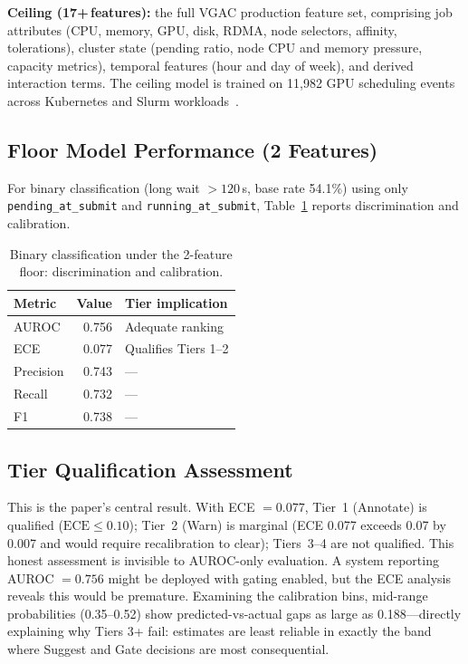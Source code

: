 \documentclass[sigconf]{acmart}
\begin{document}
\textbf{Ceiling (17+\,features):} the full VGAC production feature set, comprising job attributes (CPU, memory, GPU, disk, RDMA, node selectors, affinity, tolerations), cluster state (pending ratio, node CPU and memory pressure, capacity metrics), temporal features (hour and day of week), and derived interaction terms. The ceiling model is trained on 11,982 GPU scheduling events across Kubernetes and Slurm workloads~\cite{espira2026benchmark}.

\subsection{Floor Model Performance (2 Features)}
For binary classification (long wait $> 120$\,s, base rate 54.1\%) using only \texttt{pending\_at\_submit} and \texttt{running\_at\_submit}, Table~\ref{tab:floor} reports discrimination and calibration.

\begin{table}[t]
\centering
\caption{Binary classification under the 2-feature floor: discrimination and calibration.}
\label{tab:floor}
\small
\begin{tabular}{@{}lrl@{}}
\toprule
\textbf{Metric}    & \textbf{Value} & \textbf{Tier implication} \\
\midrule
AUROC              & 0.756 & Adequate ranking \\
ECE                & 0.077 & Qualifies Tiers 1--2 \\
Precision          & 0.743 & --- \\
Recall             & 0.732 & --- \\
F1                 & 0.738 & --- \\
\bottomrule
\end{tabular}
\end{table}

\subsection{Tier Qualification Assessment}
This is the paper's central result. With ECE $=0.077$, Tier~1 (Annotate) is qualified ($\text{ECE}\le 0.10$); Tier~2 (Warn) is marginal (ECE 0.077 exceeds 0.07 by 0.007 and would require recalibration to clear); Tiers~3--4 are not qualified. This honest assessment is invisible to AUROC-only evaluation. A system reporting AUROC $=0.756$ might be deployed with gating enabled, but the ECE analysis reveals this would be premature. Examining the calibration bins, mid-range probabilities (0.35--0.52) show predicted-vs-actual gaps as large as 0.188---directly explaining why Tiers 3+ fail: estimates are least reliable in exactly the band where Suggest and Gate decisions are most consequential.
\end{document}
